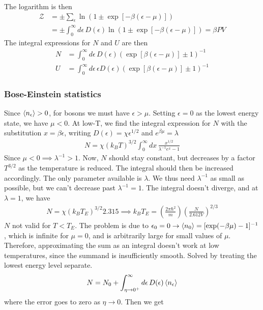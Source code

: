 \documentclass[a4paper, english, 12pt]{article}
\newcommand{\eps}{\epsilon}
\begin{document}
\begin{multicols*}{2}
The logarithm is then 
\begin{align*}
    \mathcal{Z} &= \pm \sum_\eps \ln(1 \pm \exp[-\beta(\eps-\mu)]) \\ 
    &= \pm \int_0^\infty d\eps\, D(\eps) \ln(1 \pm \exp[-\beta(\eps-\mu)]) = \beta PV
\end{align*}
The integral expressions for $N$ and $U$ are then 
\begin{align*}
    N &= \int_0^\infty d\eps\,D(\eps) (\exp[\beta(\eps-\mu)]\pm1)^{-1} \\ 
    U &= \int_0^\infty d\eps\, \eps D(\eps) (\exp[\beta(\eps-\mu)]\pm1)^{-1}
\end{align*}


\subsubsection*{Bose-Einstein statistics}
Since $\expval{n_\eps}>0$, for bosons we must have $\eps>\mu$. Setting $\eps=0$ as the lowest energy state, we have $\mu<0$. At low-T, we find the integral expression for $N$ with the substitution $x=\beta\eps$, writing $D(\eps)=\chi \eps^{1/2}$ and $e^{\beta\mu}=\lambda$ 
\begin{align*}
    N = \chi (k_B T)^{3/2} \int_0^\infty dx\, \frac{x^{1/2}}{\lambda^{-1} e^x - 1}
\end{align*}
Since $\mu<0\implies\lambda^{-1}>1$. Now, $N$ should stay constant, but decreases by a factor $T^{3/2}$ as the temperature is reduced. The integral should then be increased accordingly. The only parameter available is $\lambda$. We thus need $\lambda^{-1}$ as small as possible, but we can't decrease past $\lambda^{-1}=1$. The integral doesn't diverge, and at $\lambda=1$, we have 
\begin{align*}
    N = \chi (k_B T_E)^{3/2} 2.315 \implies k_B T_E = \left( \frac{2\pi\hbar^2}{m}\right) \left( \frac{N}{2.612V} \right)^{2/3}
\end{align*} 
$N$ not valid for $T<T_E$. The problem is due to $\eps_0=0\to\expval{n_0}=[\exp(-\beta\mu)-1]^{-1}$, which is infinite for $\mu=0$, and is arbitrarily large for small values of $\mu$. Therefore, approximating the sum as an integral doesn't work at low temperatures, since the summand is insufficiently smooth. Solved by treating the lowest energy level separate. 
\begin{align*}
    N = N_0 + \int_{\eta\to0^+}^\infty d\eps\,D(\eps) \expval{n_\eps}
\end{align*}
where the error goes to zero as $\eta\to0$. Then we get 


\end{multicols*}
\end{document}

